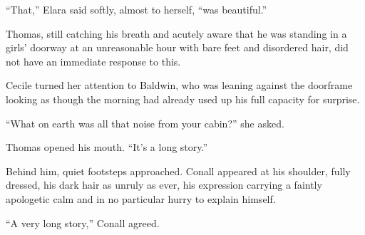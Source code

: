 \enquote{That,} Elara said softly, almost to herself, \enquote{was beautiful.}

Thomas, still catching his breath and acutely aware that he was standing in a girls' doorway at an unreasonable hour with bare feet and disordered hair, did not have an immediate response to this.

Cecile turned her attention to Baldwin, who was leaning against the doorframe looking as though the morning had already used up his full capacity for surprise.

\enquote{What on earth was all that noise from your cabin?} she asked.

Thomas opened his mouth. \enquote{It's a long story.}

Behind him, quiet footsteps approached. Conall appeared at his shoulder, fully dressed, his dark hair as unruly as ever, his expression carrying a faintly apologetic calm and in no particular hurry to explain himself.

\enquote{A very long story,} Conall agreed.

